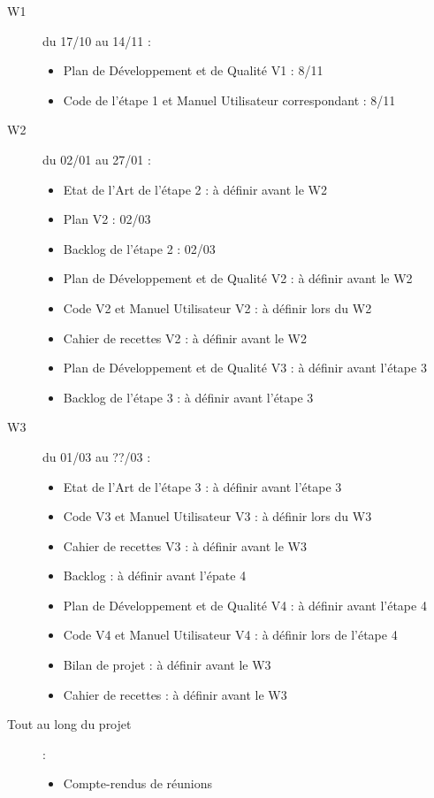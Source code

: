 \documentclass[10pt,a4paper]{article}
\begin{document}
\begin{description}

\item [W1] du 17/10 au 14/11 : 
\begin{itemize}
\item Plan de Développement et de Qualité V1 : 8/11
\item Code de l'étape 1 et Manuel Utilisateur correspondant : 8/11
\end{itemize}

\item [W2] du 02/01 au 27/01  : 
\begin{itemize}
\item Etat de l'Art de l'étape 2 : à définir avant le W2
\item Plan  V2 : 02/03
\item Backlog de l'étape 2 : 02/03
\item Plan de Développement et de Qualité V2 : à définir avant le W2
\item Code V2 et Manuel Utilisateur V2 : à définir lors du W2
\item Cahier de recettes V2 : à définir avant le W2
\item Plan de Développement et de Qualité V3 : à définir avant l'étape 3
\item Backlog de l'étape 3 : à définir avant l'étape 3
\end{itemize}

\item [W3] du 01/03 au ??/03  : 
\begin{itemize}
\item Etat de l'Art de l'étape 3  : à définir avant l'étape 3
\item Code V3 et Manuel Utilisateur V3 : à définir lors du W3
\item Cahier de recettes V3 : à définir avant le W3
\item Backlog : à définir avant l'épate 4
\item Plan de Développement et de Qualité V4 : à définir avant l'étape 4
\item Code V4 et Manuel Utilisateur V4 : à définir lors de l'étape 4
\item Bilan de projet : à définir avant le W3
\item Cahier de recettes : à définir avant le W3
\end{itemize}

\item [Tout au long du projet] : 
\begin{itemize}
\item Compte-rendus de réunions 
\end{itemize}
\end{description}
\end{document}
